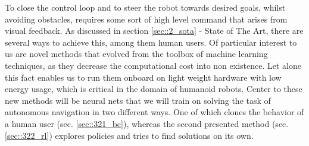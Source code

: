 To close the control loop and to steer the robot towards desired goals, whilst avoiding obstacles, requires some sort of high level command that arises from visual feedback. As discussed in section \ref{sec::2_sota} - State of The Art, there are several ways to achieve this, among them human users. Of particular interest to us are novel methods that evolved from the toolbox of machine learning techniques, as they decrease the computational cost into non existence. Let alone this fact enables us to run them onboard on light weight hardware with low energy usage, which is critical in the domain of humanoid robots. Center to these new methods will be neural nets that we will train on solving the task of autonomous navigation in two different ways. One of which clones the behavior of a human user (sec. \ref{sec::321_bc}), whereas the second presented method (sec. \ref{sec::322_rl}) explores policies and tries to find solutions on its own. 
